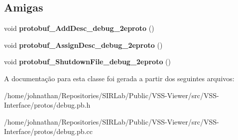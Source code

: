 \subsection*{Amigas}
\begin{DoxyCompactItemize}
\item 
void {\bfseries protobuf\+\_\+\+Add\+Desc\+\_\+debug\+\_\+2eproto} ()\hypertarget{classvss__debug_1_1Global__Debug_a1b63d082883c064c19c50d8480e334a9}{}\label{classvss__debug_1_1Global__Debug_a1b63d082883c064c19c50d8480e334a9}

\item 
void {\bfseries protobuf\+\_\+\+Assign\+Desc\+\_\+debug\+\_\+2eproto} ()\hypertarget{classvss__debug_1_1Global__Debug_acdc8c7570bce883b7ac02f39e0d06b54}{}\label{classvss__debug_1_1Global__Debug_acdc8c7570bce883b7ac02f39e0d06b54}

\item 
void {\bfseries protobuf\+\_\+\+Shutdown\+File\+\_\+debug\+\_\+2eproto} ()\hypertarget{classvss__debug_1_1Global__Debug_a887dbf1466fd19ec2c6fb3c242c65a67}{}\label{classvss__debug_1_1Global__Debug_a887dbf1466fd19ec2c6fb3c242c65a67}

\end{DoxyCompactItemize}


A documentação para esta classe foi gerada a partir dos seguintes arquivos\+:\begin{DoxyCompactItemize}
\item 
/home/johnathan/\+Repositories/\+S\+I\+R\+Lab/\+Public/\+V\+S\+S-\/\+Viewer/src/\+V\+S\+S-\/\+Interface/protos/debug.\+pb.\+h\item 
/home/johnathan/\+Repositories/\+S\+I\+R\+Lab/\+Public/\+V\+S\+S-\/\+Viewer/src/\+V\+S\+S-\/\+Interface/protos/debug.\+pb.\+cc\end{DoxyCompactItemize}
